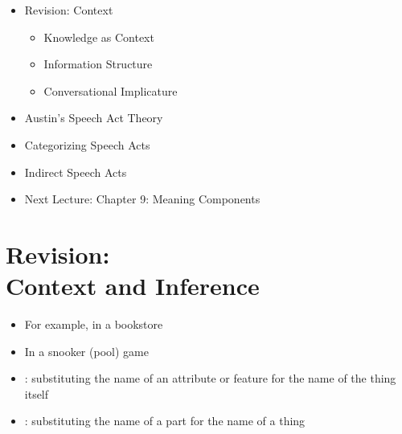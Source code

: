 \documentclass[headrule,footrule]{foils}
\begin{document}
\maketitle

%


\begin{itemize}\addtolength{\itemsep}{-1ex}
\item Revision: Context
  \begin{itemize}
  \item Knowledge as Context
  \item Information Structure
  \item Conversational Implicature
  \end{itemize}
\item Austin's Speech Act Theory
\item Categorizing Speech Acts
\item Indirect Speech Acts
\item Next Lecture: Chapter 9: Meaning Components
\end{itemize}

%


\section{Revision: \\ Context and Inference}





\begin{itemize}\addtolength{\itemsep}{-1ex}
\item For example, in a bookstore
  \begin{exe}
    \ex {}
  \end{exe}
\item In a snooker (pool)  game
  \begin{exe}
    \ex {}
  \end{exe}
\item {}: substituting the name of an attribute or feature for the name of the thing itself
  \begin{exe}
    \ex {}
    \ex {}
  \end{exe}
  \item {}: substituting the name of a part for the name of a thing
  \begin{exe}
    \ex {}
  \end{exe}
\end{itemize}
\end{document}
